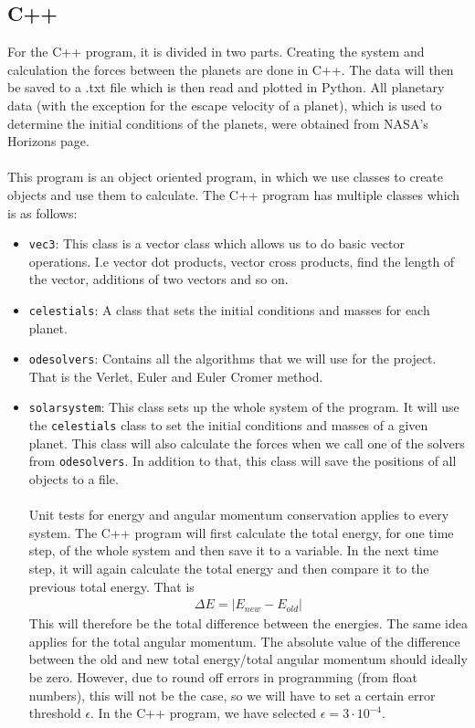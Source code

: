 \documentclass{article}
\begin{document}
\subsection{C++}
For the C++ program, it is divided in two parts. Creating the system and calculation the forces between the planets are done in C++. The data will then be saved to a .txt file which is then read and plotted in Python. All planetary data (with the exception for the escape velocity of a planet), which is used to determine the initial conditions of the planets, were obtained from NASA's Horizons page. \\\\
This program is an object oriented program, in which we use classes to create objects and use them to calculate. The C++ program has multiple classes which is as follows:
\begin{itemize}
\item \texttt{vec3}: This class is a vector class which allows us to do basic vector operations. I.e vector dot products, vector cross products, find the length of the vector, additions of two vectors and so on.
\item \texttt{celestials}: A class that sets the initial conditions and masses for each planet. 
\item \texttt{odesolvers}: Contains all the algorithms that we will use for the project. That is the Verlet, Euler and Euler Cromer method.
\item \texttt{solarsystem}: This class sets up the whole system of the program. It will use the \texttt{celestials} class to set the initial conditions and masses of a given planet. This class will also calculate the forces when we call one of the solvers from \texttt{odesolvers}. In addition to that, this class will save the positions of all objects to a file. \\\\
Unit tests for energy and angular momentum conservation applies to every system. The C++ program will first calculate the total energy, for one time step, of the whole system and then save it to a variable. In the next time step, it will again calculate the total energy and then compare it to the previous total energy. That is
\begin{align*}
\Delta E = |E_{new} - E_{old}|
\end{align*}
This will therefore be the total difference between the energies. The same idea applies for the total angular momentum. The absolute value of the difference between the old and new total energy/total angular momentum should ideally be zero. However, due to round off errors in programming (from float numbers), this will not be the case, so we will have to set a certain error threshold $\epsilon$. In the C++ program, we have selected $\epsilon = 3\cdot10^{-4}$. \\\\

\end{itemize}
\end{document}

